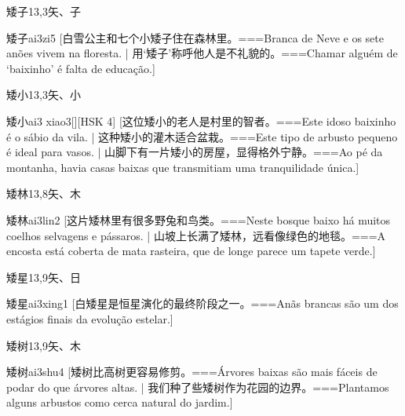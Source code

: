 \begin{Entry}{矮子}{13,3}{⽮、⼦}
  \begin{Phonetics}{矮子}{ai3zi5}
    [白雪公主和七个小矮子住在森林里。===Branca de Neve e os sete anões vivem na floresta. | 用`矮子'称呼他人是不礼貌的。===Chamar alguém de `baixinho' é falta de educação.]
  \end{Phonetics}
\end{Entry}

\begin{Entry}{矮小}{13,3}{⽮、⼩}
  \begin{Phonetics}{矮小}{ai3 xiao3}[][HSK 4]
    [这位矮小的老人是村里的智者。===Este idoso baixinho é o sábio da vila. | 这种矮小的灌木适合盆栽。===Este tipo de arbusto pequeno é ideal para vasos. | 山脚下有一片矮小的房屋，显得格外宁静。===Ao pé da montanha, havia casas baixas que transmitiam uma tranquilidade única.]
  \end{Phonetics}
\end{Entry}

\begin{Entry}{矮林}{13,8}{⽮、⽊}
  \begin{Phonetics}{矮林}{ai3lin2}
    [这片矮林里有很多野兔和鸟类。===Neste bosque baixo há muitos coelhos selvagens e pássaros. | 山坡上长满了矮林，远看像绿色的地毯。===A encosta está coberta de mata rasteira, que de longe parece um tapete verde.]
  \end{Phonetics}
\end{Entry}

\begin{Entry}{矮星}{13,9}{⽮、⽇}
  \begin{Phonetics}{矮星}{ai3xing1}
    [白矮星是恒星演化的最终阶段之一。===Anãs brancas são um dos estágios finais da evolução estelar.]
  \end{Phonetics}
\end{Entry}

\begin{Entry}{矮树}{13,9}{⽮、⽊}
  \begin{Phonetics}{矮树}{ai3shu4}
    [矮树比高树更容易修剪。===Árvores baixas são mais fáceis de podar do que árvores altas. | 我们种了些矮树作为花园的边界。===Plantamos alguns arbustos como cerca natural do jardim.]
  \end{Phonetics}
\end{Entry}

